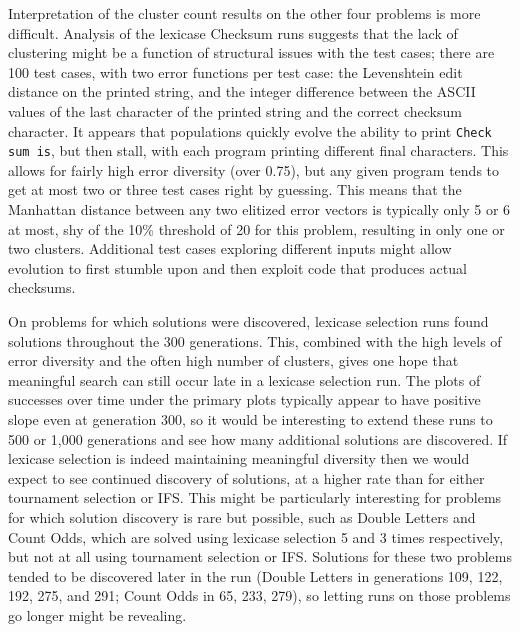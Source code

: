 Interpretation of the cluster count results on the other four problems is more difficult. Analysis
of the lexicase Checksum runs suggests that the lack of clustering might be a function
of structural issues with the test cases; 
there are 100 test cases, with two error functions per test case:  the Levenshtein edit distance on the printed string, and the integer difference between the ASCII values of the last character of the printed string and the correct checksum character.
It appears that populations quickly evolve the ability to print \texttt{Check sum is}, but
then stall, with each program printing different final characters. This allows for fairly high error diversity (over 0.75), but any given program tends to  get at most two or three test 
cases right by guessing. This means that the Manhattan distance between any two elitized error vectors
is typically only 5 or 6 at most, shy of the 10\% threshold of 20 for this problem, resulting in only one or two clusters.
Additional test cases exploring different inputs might allow evolution to first stumble upon and then exploit code that produces actual checksums.

On problems for which solutions were discovered, lexicase selection runs found solutions throughout the 300 generations. This, combined with the high levels of error diversity and the often 
high number of clusters, gives one hope that meaningful search can still occur late in a lexicase selection run. The plots of successes over time under the primary plots
typically appear to have positive slope even at generation 300, so it would be interesting to
extend these runs to 500 or 1,000 generations and see how many additional solutions are discovered.
If lexicase selection is indeed maintaining meaningful diversity then we would expect to see continued discovery of solutions, at a higher rate than for either tournament selection or IFS. This might be
particularly interesting for problems for which solution discovery is rare but possible, such as
Double Letters and Count Odds, which are solved using lexicase selection 5 and 3 times respectively, but not
at all using tournament selection or IFS. Solutions for these two problems tended to be discovered
later in the run (Double Letters in generations 109, 122, 192, 275, and 291; Count Odds in 65, 233, 279), so letting
runs on those problems go longer might be revealing.

